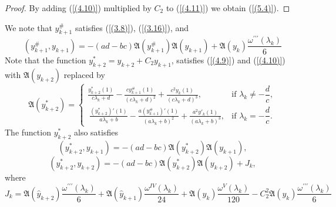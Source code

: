 \documentclass[10pt,a4paper]{amsart}
\numberwithin{equation}{section}
\begin{document}
\begin{proof} By adding (\ref{(4.10)}) multiplied by $C_2$ to (\ref{(4.11)}) we obtain (\ref{(5.4)}).
\end{proof}
We note that $y^{\#}_{k+1}$ satisfies (\ref{(3.8)}), (\ref{(3.16)}), and 
\begin{equation}
(y_{k+1}^\#, y_{k+1}) =-(ad-bc)\mathfrak{A}(y_{k+1}^\#)\mathfrak{A}(y_{k+1})+\mathfrak{A}(y_{k})\frac{\omega^{\prime\prime\prime}(\lambda_k)}{6} \label{(5.5)}
\end{equation}
Note that the function \(y^{*}_{k+2}=y_{k+2}+C_{2}y_{k+1}\), satisfies (\ref{(4.9)}) and (\ref{(4.10)}) with $\mathfrak{A}(y_{k+2})$ replaced by 
\begin{equation}
   \mathfrak{A}(y^{*}_{k+2}) =
\begin{cases}
\displaystyle  
\frac{y^{*}_{k + 2}(1)}{c\lambda_{k} + d} - \frac{cy^{\#}_{k+1}(1)}{\left( c\lambda_{k} + d \right)^{2}}
+\frac{c^2y_{k}(1)}{\left( c\lambda_{k} + d \right)^{3}}, 
& \text{if } \lambda_k \neq -\dfrac{d}{c}, \\[10pt]
\displaystyle \ 
\frac{(y^{*}_{k + 2})'(1)}{a\lambda_{k} + b} - \frac{a(y^{\#}_{k+1})'(1)}{\left( a\lambda_{k} + b \right)^{2}}
+\frac{a^2y'_{k}(1)}{\left( a\lambda_{k} + b\right)^{3}}, 
& \text{if } \lambda_k = -\dfrac{d}{c}.
\end{cases} \label{(5.5.2)}
\end{equation}
The function $y^{*}_{k + 2}$ also satisfies 
\begin{equation}
(y_{k+2}^*, y_{k+1}) =-(ad-bc)\mathfrak{A}(y_{k+2}^*)\mathfrak{A}(y_{k+1}), \label{(5.6)}
\end{equation}
\begin{equation}
(y_{k+2}^*, y_{k+2}) =-(ad-bc)\mathfrak{A}(y_{k+2}^*)\mathfrak{A}(y_{k+2})+J_k, \label{(5.7)}
\end{equation}
where 
 \begin{equation}
   J_k 
    ={\mathfrak{A}(\hat{y}_{k+2})\frac{\omega^{\prime\prime\prime}(\lambda_k)}{6}+\mathfrak{A}(\hat{y}_{k+1})\frac{\omega^{IV}(\lambda_k)}{24}}+{\mathfrak{A}(y_k)\frac{\omega^{V}(\lambda_k)}{120}}-C_2^2\mathfrak{A}(y_k)\frac{\omega^{\prime\prime\prime}(\lambda_k)}{6}\label{(5.8)}
\end{equation}
\end{document}
